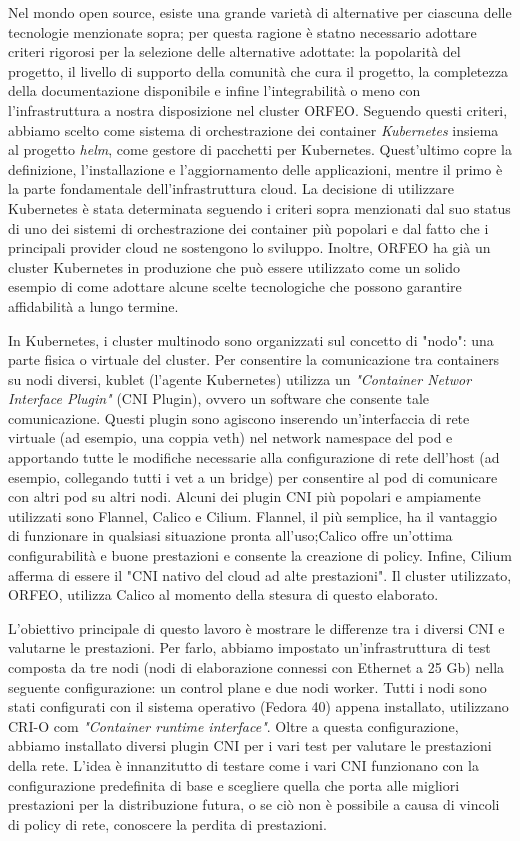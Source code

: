 Nel mondo open source, esiste una grande varietà di alternative per ciascuna
delle tecnologie menzionate sopra; per questa ragione è statno necessario
adottare criteri rigorosi per la selezione delle alternative adottate:
la popolarità del progetto, il livello di supporto della comunità che cura il
progetto, la completezza della documentazione disponibile e infine
l'integrabilità o meno con l'infrastruttura a  nostra disposizione nel cluster ORFEO.
Seguendo questi criteri, abbiamo scelto come sistema di orchestrazione dei
container \textit{Kubernetes} insiema al progetto \textit{helm}, come gestore di
pacchetti per Kubernetes.
Quest'ultimo copre la definizione, l'installazione e l'aggiornamento delle
applicazioni, mentre il primo è la parte fondamentale dell'infrastruttura cloud.
La decisione di utilizzare Kubernetes è stata determinata seguendo i criteri sopra menzionati
dal suo status di uno dei sistemi di orchestrazione dei container più popolari e
dal fatto che i principali provider cloud ne sostengono lo sviluppo.
Inoltre, ORFEO ha già un cluster Kubernetes in produzione che può essere
utilizzato come un solido esempio di come adottare alcune scelte tecnologiche
che possono garantire affidabilità a lungo termine.


In Kubernetes, i cluster multinodo sono organizzati sul concetto di  "nodo": una
parte fisica o virtuale del cluster.
Per consentire la comunicazione tra containers su nodi diversi, kublet (l'agente
Kubernetes) utilizza un  \textit{"Container Networ Interface Plugin"} (CNI
Plugin), ovvero un software che consente tale  comunicazione.
Questi plugin sono agiscono inserendo un'interfaccia di rete virtuale (ad
esempio, una coppia veth) nel network namespace del pod e apportando
tutte le modifiche necessarie alla configurazione di rete dell'host (ad esempio,
collegando tutti i vet a un bridge) per consentire al pod di  comunicare con
altri pod su altri nodi.
Alcuni dei plugin CNI più popolari e ampiamente utilizzati sono Flannel, Calico
e Cilium. Flannel, il più semplice, ha il vantaggio di funzionare in qualsiasi
situazione pronta all'uso;Calico offre un'ottima configurabilità e buone
prestazioni e consente la creazione di policy.
Infine, Cilium afferma di essere il "CNI nativo del cloud ad alte prestazioni".
Il cluster utilizzato, ORFEO, utilizza Calico al momento della stesura di
questo elaborato.


L'obiettivo principale di questo lavoro è mostrare le differenze tra i diversi
CNI e valutarne le prestazioni.
Per farlo, abbiamo impostato un'infrastruttura di test composta da tre nodi
(nodi di elaborazione connessi con Ethernet a 25 Gb) nella seguente configurazione:
un control plane e due nodi worker.
Tutti i nodi sono stati configurati con il sistema operativo (Fedora 40) appena
installato, utilizzano CRI-O com \textit{"Container runtime interface"}.
Oltre a questa configurazione, abbiamo installato diversi plugin CNI per i vari
test per valutare le prestazioni della rete.
L'idea è innanzitutto di testare come i vari CNI funzionano con la
configurazione predefinita di base e scegliere quella che porta alle migliori
prestazioni per la distribuzione futura, o se ciò non è possibile a causa di
vincoli di policy di rete, conoscere la perdita di prestazioni.


